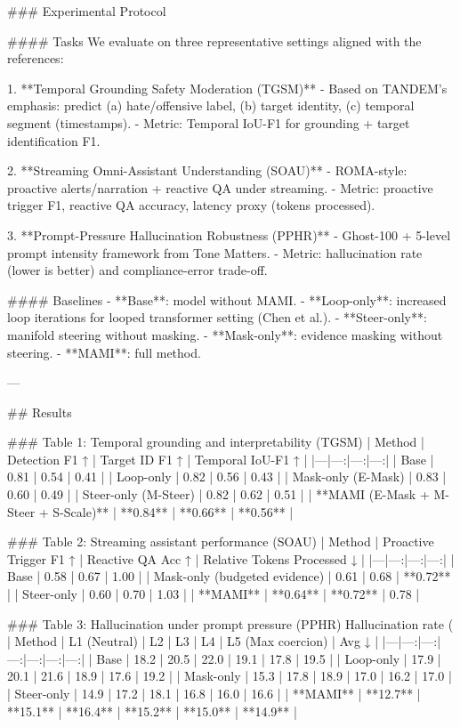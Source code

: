 ### Experimental Protocol  

#### Tasks  
We evaluate on three representative settings aligned with the references:

1. **Temporal Grounding Safety Moderation (TGSM)**  
   - Based on TANDEM’s emphasis: predict (a) hate/offensive label, (b) target identity, (c) temporal segment (timestamps).  
   - Metric: Temporal IoU-F1 for grounding + target identification F1.

2. **Streaming Omni-Assistant Understanding (SOAU)**  
   - ROMA-style: proactive alerts/narration + reactive QA under streaming.  
   - Metric: proactive trigger F1, reactive QA accuracy, latency proxy (tokens processed).

3. **Prompt-Pressure Hallucination Robustness (PPHR)**  
   - Ghost-100 + 5-level prompt intensity framework from Tone Matters.  
   - Metric: hallucination rate (lower is better) and compliance-error trade-off.

#### Baselines  
- **Base**: model without MAMI.  
- **Loop-only**: increased loop iterations for looped transformer setting (Chen et al.).  
- **Steer-only**: manifold steering without masking.  
- **Mask-only**: evidence masking without steering.  
- **MAMI**: full method.

---

## Results  

### Table 1: Temporal grounding and interpretability (TGSM)  
| Method | Detection F1 ↑ | Target ID F1 ↑ | Temporal IoU-F1 ↑ |
|---|---:|---:|---:|
| Base | 0.81 | 0.54 | 0.41 |
| Loop-only | 0.82 | 0.56 | 0.43 |
| Mask-only (E-Mask) | 0.83 | 0.60 | 0.49 |
| Steer-only (M-Steer) | 0.82 | 0.62 | 0.51 |
| **MAMI (E-Mask + M-Steer + S-Scale)** | **0.84** | **0.66** | **0.56** |

### Table 2: Streaming assistant performance (SOAU)  
| Method | Proactive Trigger F1 ↑ | Reactive QA Acc ↑ | Relative Tokens Processed ↓ |
|---|---:|---:|---:|
| Base | 0.58 | 0.67 | 1.00 |
| Mask-only (budgeted evidence) | 0.61 | 0.68 | **0.72** |
| Steer-only | 0.60 | 0.70 | 1.03 |
| **MAMI** | **0.64** | **0.72** | 0.78 |

### Table 3: Hallucination under prompt pressure (PPHR)  
Hallucination rate (%
| Method | L1 (Neutral) | L2 | L3 | L4 | L5 (Max coercion) | Avg ↓ |
|---|---:|---:|---:|---:|---:|---:|
| Base | 18.2 | 20.5 | 22.0 | 19.1 | 17.8 | 19.5 |
| Loop-only | 17.9 | 20.1 | 21.6 | 18.9 | 17.6 | 19.2 |
| Mask-only | 15.3 | 17.8 | 18.9 | 17.0 | 16.2 | 17.0 |
| Steer-only | 14.9 | 17.2 | 18.1 | 16.8 | 16.0 | 16.6 |
| **MAMI** | **12.7** | **15.1** | **16.4** | **15.2** | **15.0** | **14.9** |

